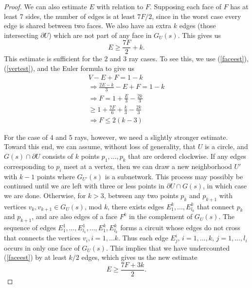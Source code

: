\begin{proof}
We can also estimate $E$ with relation to $F$.  Supposing each face of $F$ has at least 7 sides, the number of edges is at least $7F/2$, since in the  worst case every edge is shared between two faces.  We also have an extra $k$ edges (those intersecting $\partial U$) which are not part of any face in $G_U(s)$. This gives us
\begin{equation}\label{faceest}
E\ge\frac{7F}{2}+k.
\end{equation}
This estimate is sufficient for the $2$ and $3$ ray cases.  To see this, we use (\ref{faceest}), (\ref{vertest}), and the Euler formula to give us
\begin{eqnarray}
V-E+F= 1-k \\
\Rightarrow \frac{2E-k}{3} -E+F = 1-k\nonumber\\
\Rightarrow F =1+\frac{E}3-\frac{2k}3 \nonumber\\
\ge1+\frac {7F}{6}+\frac k3-\frac {2k}3 \nonumber\\
\Rightarrow F\le 2(k-3)\nonumber
\end{eqnarray}

For the case of 4 and 5 rays, however, we need a slightly stronger estimate. Toward this end,  we can assume, without loss of generality, that $U$ is a circle, and $G(s)\cap \partial U$ consists of $k$ points $p_1, \dots, p_k$ that are ordered clockwise. If any edges corresponding to $p_i$ meet at a vertex, then we can draw a new neighborhood $U'$ with $k-1$ points where $G_{U'}(s)$ is a subnetwork.  This process may possibly be continued until we are left with three or less points in $\partial U\cap G(s)$, in which case we are done. Otherwise, for $k > 3$, between any two points $p_k$ and $p_{k+1}$ with vertices $v_k,v_{k+1} \in G_U(s)$, mod $k$, there exists edges $E_1^k, \dots, E_{l_k}^k$ that connect $p_k$ and $p_{k+1}$, and are also edges of a face $F^k$ in the complement of $G_U(s)$. The sequence of edges $E_1^1,\dots, E_{l_1}^1, \dots, E_1^k, E_{l_k}^k$ forms a circuit whose edges do not cross that connects the vertices $v_i, i = 1, \dots k$.  Thus each edge $E_j^i$, $i = 1, \dots, k$, $j = 1, \dots, l_i$ occurs in only one face of $G_U(s)$.  This implies that we have undercounted (\ref{faceest}) by at least $k/2$ edges, which gives us the new estimate
\begin{equation}\label{strongfaceest}
E \ge \frac{7F+3k}{2} .
\end{equation} 





\end{proof}

